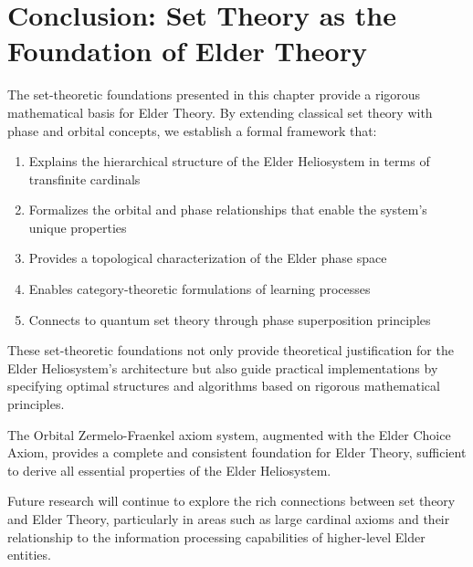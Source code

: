\section{Conclusion: Set Theory as the Foundation of Elder Theory}

The set-theoretic foundations presented in this chapter provide a rigorous mathematical basis for Elder Theory. By extending classical set theory with phase and orbital concepts, we establish a formal framework that:

\begin{enumerate}
    \item Explains the hierarchical structure of the Elder Heliosystem in terms of transfinite cardinals
    \item Formalizes the orbital and phase relationships that enable the system's unique properties
    \item Provides a topological characterization of the Elder phase space
    \item Enables category-theoretic formulations of learning processes
    \item Connects to quantum set theory through phase superposition principles
\end{enumerate}

These set-theoretic foundations not only provide theoretical justification for the Elder Heliosystem's architecture but also guide practical implementations by specifying optimal structures and algorithms based on rigorous mathematical principles.

\begin{theorem}
The Orbital Zermelo-Fraenkel axiom system, augmented with the Elder Choice Axiom, provides a complete and consistent foundation for Elder Theory, sufficient to derive all essential properties of the Elder Heliosystem.
\end{theorem}

Future research will continue to explore the rich connections between set theory and Elder Theory, particularly in areas such as large cardinal axioms and their relationship to the information processing capabilities of higher-level Elder entities.